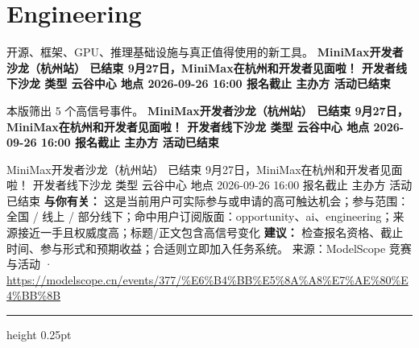 \documentclass[10.5pt]{ctexart}
\begin{document}
\section*{Engineering}
{\color{ormuted} 开源、框架、GPU、推理基础设施与真正值得使用的新工具。}
\vspace{2mm}
{\LARGE\bfseries MiniMax开发者沙龙（杭州站） 已结束 9月27日，MiniMax在杭州和开发者见面啦！ 开发者线下沙龙 类型 云谷中心 地点 2026-09-26 16:00 报名截止 主办方 活动已结束}\par
\vspace{1mm}
{\color{ormuted} 本版筛出 5 个高信号事件。}
\vspace{3mm}
{\Large\bfseries MiniMax开发者沙龙（杭州站） 已结束 9月27日，MiniMax在杭州和开发者见面啦！ 开发者线下沙龙 类型 云谷中心 地点 2026-09-26 16:00 报名截止 主办方 活动已结束}\par
MiniMax开发者沙龙（杭州站） 已结束 9月27日，MiniMax在杭州和开发者见面啦！ 开发者线下沙龙 类型 云谷中心 地点 2026-09-26 16:00 报名截止 主办方 活动已结束
\textbf{与你有关：} 这是当前用户可实际参与或申请的高可触达机会；参与范围：全国 / 线上 / 部分线下；命中用户订阅版面：opportunity、ai、engineering；来源接近一手且权威度高；标题/正文包含高信号变化
\textbf{建议：} 检查报名资格、截止时间、参与形式和预期收益；合适则立即加入任务系统。
{\footnotesize\color{ormuted} 来源：ModelScope 竞赛与活动 · \url{https://modelscope.cn/events/377/%E6%B4%BB%E5%8A%A8%E7%AE%80%E4%BB%8B}}
\vspace{4mm}
\hrule height 0.25pt
\vspace{3mm}
\end{document}
